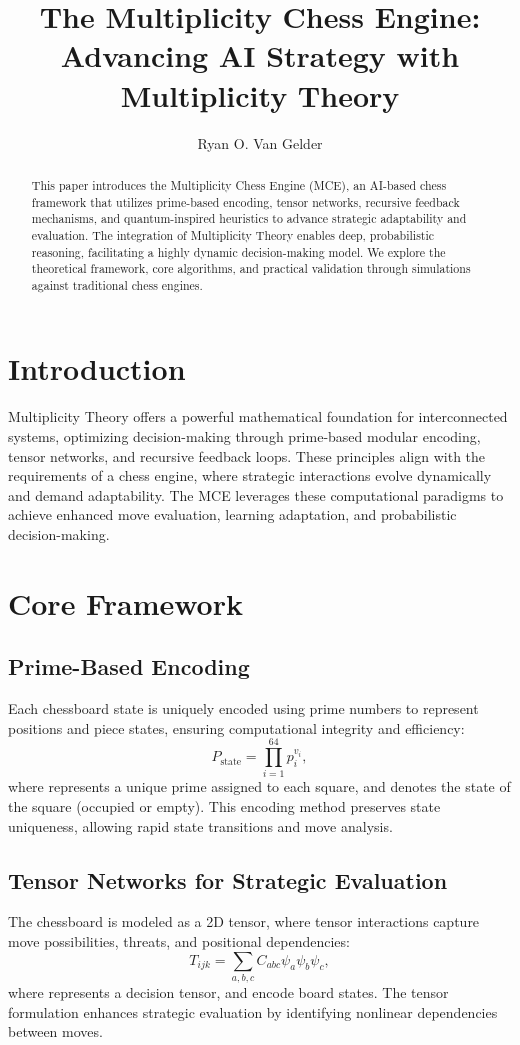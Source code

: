 \documentclass{article}
\title{The Multiplicity Chess Engine: Advancing AI Strategy with Multiplicity Theory}
\author{Ryan O. Van Gelder}
\affil{Citizen Gardens - The Foundation of Multiplicity \ info@citizengardens.org}
\date{}
\begin{document}
\maketitle

\begin{abstract} This paper introduces the Multiplicity Chess Engine (MCE), an AI-based chess framework that utilizes prime-based encoding, tensor networks, recursive feedback mechanisms, and quantum-inspired heuristics to advance strategic adaptability and evaluation. The integration of Multiplicity Theory enables deep, probabilistic reasoning, facilitating a highly dynamic decision-making model. We explore the theoretical framework, core algorithms, and practical validation through simulations against traditional chess engines. \end{abstract}

\section{Introduction} Multiplicity Theory offers a powerful mathematical foundation for interconnected systems, optimizing decision-making through prime-based modular encoding, tensor networks, and recursive feedback loops. These principles align with the requirements of a chess engine, where strategic interactions evolve dynamically and demand adaptability. The MCE leverages these computational paradigms to achieve enhanced move evaluation, learning adaptation, and probabilistic decision-making.

\section{Core Framework} \subsection{Prime-Based Encoding} Each chessboard state is uniquely encoded using prime numbers to represent positions and piece states, ensuring computational integrity and efficiency: \begin{equation} P_{\text{state}} = \prod_{i=1}^{64} p_i^{v_i}, \end{equation} where  represents a unique prime assigned to each square, and  denotes the state of the square (occupied or empty). This encoding method preserves state uniqueness, allowing rapid state transitions and move analysis.

\subsection{Tensor Networks for Strategic Evaluation} The chessboard is modeled as a 2D tensor, where tensor interactions capture move possibilities, threats, and positional dependencies: \begin{equation} T_{ijk} = \sum_{a,b,c} C_{abc} \psi_a \psi_b \psi_c, \end{equation} where  represents a decision tensor, and  encode board states. The tensor formulation enhances strategic evaluation by identifying nonlinear dependencies between moves.
\end{document}
